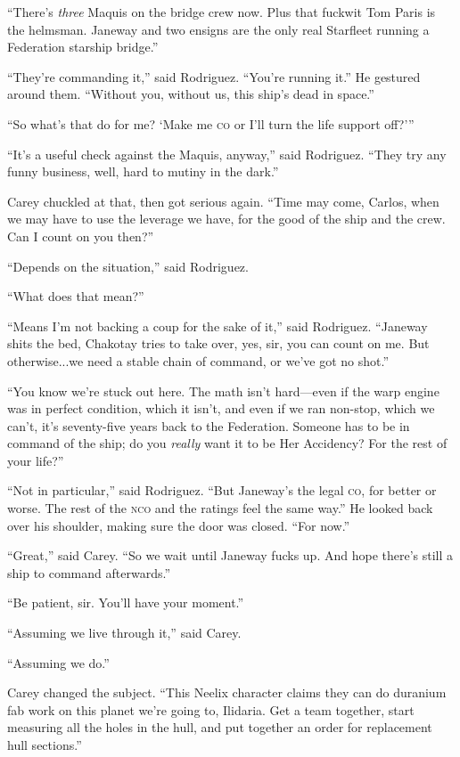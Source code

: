 \documentclass[twoside,letterpaper,12pt]{memoir}
\begin{document}
``There’s \textit{three} Maquis on the bridge crew now. Plus that fuckwit Tom Paris is the helmsman. Janeway and two ensigns are the only real Starfleet running a Federation starship bridge.” 

``They’re commanding it,” said Rodriguez. ``You’re running it.” He gestured around them. ``Without you, without us, this ship’s dead in space.” 

``So what’s that do for me? `Make me \textsc{co} or I’ll turn the life support off?''' 

``It’s a useful check against the Maquis, anyway,” said Rodriguez. ``They try any funny business, well, hard to mutiny in the dark.” 

Carey chuckled at that, then got serious again. ``Time may come, Carlos, when we may have to use the leverage we have, for the good of the ship and the crew. Can I count on you then?” 

``Depends on the situation,” said Rodriguez. 

``What does that mean?” 

``Means I’m not backing a coup for the sake of it,” said Rodriguez. ``Janeway shits the bed, Chakotay tries to take over, yes, sir, you can count on me. But otherwise...we need a stable chain of command, or we’ve got no shot.” 

``You know we’re stuck out here. The math isn’t hard—even if the warp engine was in perfect condition, which it isn’t, and even if we ran non-stop, which we can’t, it’s seventy-five years back to the Federation. Someone has to be in command of the ship; do you \textit{really }want it to be Her Accidency? For the rest of your life?” 

``Not in particular,” said Rodriguez. ``But Janeway’s the legal \textsc{co}, for better or worse. The rest of the \textsc{nco} and the ratings feel the same way.” He looked back over his shoulder, making sure the door was closed. ``For now.” 

``Great,” said Carey. ``So we wait until Janeway fucks up. And hope there’s still a ship to command afterwards.” 

``Be patient, sir. You’ll have your moment.” 

``Assuming we live through it,” said Carey. 

``Assuming we do.” 

Carey changed the subject. ``This Neelix character claims they can do duranium fab work on this planet we’re going to, Ilidaria. Get a team together, start measuring all the holes in the hull, and put together an order for replacement hull sections.” 
\end{document}
